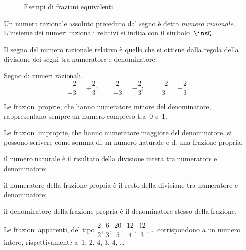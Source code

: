 \begin{figure}[t]
\centering 
\caption{Esempi di frazioni equivalenti.}\label{fig:frazequiv}
\end{figure}

\begin{definizione}
Un numero razionale assoluto preceduto dal segno è detto \emph{numero razionale}.
L'insieme dei numeri razionali relativi si indica con il simbolo~$\insQ$.
\end{definizione}

Il segno del numero razionale relativo è quello che si ottiene dalla regola della
divisione dei segni tra numeratore e denominatore.

\begin{exrig}
\begin{esempio}
Segno di numeri razionali.
\[\frac{-2}{-3}=+\frac{2}{3};\qquad\frac{2}{-3}=-\frac{2}{3};\qquad\frac{-2}{3}=-\frac{2}{3}.\]
\end{esempio}
\end{exrig}

Le frazioni proprie, che hanno numeratore minore del denominatore, rappresentano sempre un numero compreso tra~0 e~1.

\pagebreak

Le frazioni improprie, che hanno numeratore maggiore del denominatore, si possono scrivere come somma di un numero
naturale e di una frazione propria:
\begin{itemize*}
 \item il numero naturale è il risultato della divisione intera tra numeratore e denominatore;
 \item il numeratore della frazione propria è il resto della divisione tra numeratore e denominatore;
 \item il denominatore della frazione propria è il denominatore stesso della frazione.
\end{itemize*}

Le frazioni apparenti, del tipo
$\dfrac{2}{2}$, $\dfrac{6}{3}$, $\dfrac{20}{5}$, $\dfrac{12}{4}$, $\dfrac{12}{3}$, \ldots{}
corrispondono a un numero intero, rispettivamente a~1, 2, 4, 3, 4, \ldots{}

